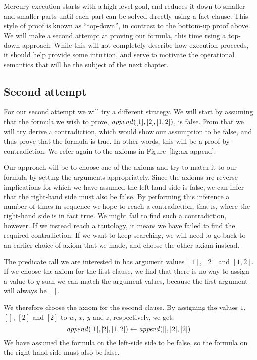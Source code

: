 Mercury execution starts with a high level goal,
and reduces it down to smaller and smaller parts
until each part can be solved directly using a fact clause.
This style of proof is known as ``top-down'',
in contrast to the bottom-up proof above.
We will make a second attempt at proving our formula,
this time using a top-down approach.
While this will not completely describe how execution proceeds,
it should help provide some intuition,
and serve to motivate the operational semantics
that will be the subject of the next chapter.


\subsection*{Second attempt}
\label{sec:reasoning2}

For our second attempt we will try a different strategy.
We will start by assuming that the formula we wish to prove,
$\text{\textit{append}}([1], [2], [1, 2])$, is false.
From that we will try derive a contradiction,
which would show our assumption to be false,
and thus prove that the formula is true.
In other words,
this will be a proof-by-contradiction.
We refer again to the axioms in Figure~\ref{fig:ax-append}.

Our approach will be to choose one of the axioms
and try to match it to our formula
by setting the arguments appropriately.
Since the axioms are reverse implications
for which we have assumed the left-hand side is false,
we can infer that the right-hand side must also be false.
By performing this inference a number of times in sequence
we hope to reach a contradiction,
that is, where the right-hand side is in fact true.
We might fail to find such a contradiction, however.
If we instead reach a tautology,
it means we have failed to find the required contradiction.
If we want to keep searching,
we will need to go back to an earlier choice of axiom that we made,
and choose the other axiom instead.

The predicate call we are interested in
has argument values $[1]$, $[2]$ and $[1, 2]$.
If we choose the axiom for the first clause,
we find that there is no way to assign a value to $y$
such we can match the argument values,
because the first argument will always be $[]$.

We therefore choose the axiom for the second clause.
By assigning the values
$1$, $[]$, $[2]$ and $[2]$
to $w$, $x$, $y$ and $z$, respectively,
we get:
\[
    \text{\textit{append}}([1], [2], [1, 2]) \leftarrow \text{\textit{append}}([], [2], [2])
\]
We have assumed the formula on the left-side side to be false,
so the formula on the right-hand side must also be false.

